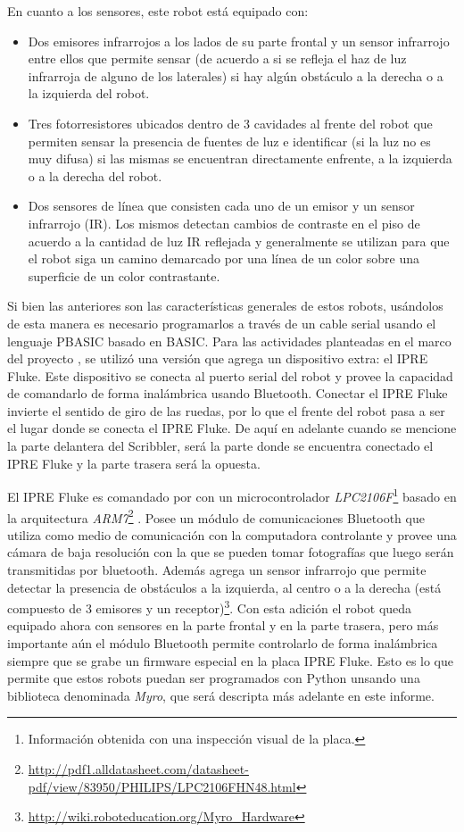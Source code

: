 En cuanto a los sensores, este robot está equipado con:
\begin{itemize}
    \item Dos emisores infrarrojos a los lados de su parte frontal y un
        sensor infrarrojo entre ellos que permite sensar (de acuerdo a si se
        refleja el haz de luz infrarroja de alguno de los laterales) si
        hay algún obstáculo a la derecha o a la izquierda del robot.
    \item Tres fotorresistores ubicados dentro de 3 cavidades al frente del
        robot que permiten sensar la presencia de fuentes de luz e
        identificar (si la luz no es muy difusa) si las mismas se encuentran
        directamente enfrente, a la izquierda o a la derecha del robot.
    \item Dos sensores de línea que consisten cada uno de un emisor
        y un sensor infrarrojo (IR). Los mismos detectan cambios de contraste
        en el piso de acuerdo a la cantidad de luz IR reflejada y generalmente
        se utilizan para que el robot siga un camino demarcado por una línea
        de un color sobre una superficie de un color contrastante.
\end{itemize}

Si bien las anteriores son las características generales de estos robots, usándolos
de esta manera es necesario programarlos a través de un cable serial usando el
lenguaje PBASIC basado en BASIC. Para las actividades planteadas en el marco del
proyecto \proyecto{}, se utilizó  una versión
que agrega un dispositivo extra: el IPRE Fluke. Este dispositivo se conecta al puerto
serial del robot y provee la capacidad de comandarlo de forma inalámbrica
usando Bluetooth.  Conectar el
IPRE Fluke invierte el sentido de giro de las ruedas, por lo que el frente
del robot pasa a ser el lugar donde se conecta el IPRE Fluke. De aquí
en adelante cuando se mencione la parte delantera del Scribbler, será la
parte donde se encuentra conectado el IPRE Fluke y la parte trasera será la
opuesta.

El IPRE Fluke es comandado por con un microcontrolador
\textit{LPC2106F}\footnote{Información obtenida con una inspección visual
de la placa.}
basado en la arquitectura
\textit{ARM7}\footnote{\url{http://pdf1.alldatasheet.com/datasheet-pdf/view/83950/PHILIPS/LPC2106FHN48.html}}
. Posee un módulo de comunicaciones
Bluetooth que utiliza como medio de comunicación con la computadora
controlante y
provee una cámara de baja resolución con la que se pueden tomar fotografías
que luego serán transmitidas por bluetooth. Además agrega
un sensor infrarrojo que permite detectar la presencia de obstáculos
a la izquierda, al centro o a la derecha (está compuesto de 3 emisores
y un
receptor)\footnote{\url{http://wiki.roboteducation.org/Myro_Hardware}}.
Con esta adición el robot queda equipado ahora con sensores
en la parte frontal y en la parte trasera, pero más importante aún
el módulo Bluetooth permite controlarlo de forma inalámbrica siempre
que se grabe un firmware especial en la placa IPRE Fluke. Esto es lo que permite
que estos robots puedan ser programados con Python unsando una biblioteca denominada
\textit{Myro}, que será descripta más adelante en este informe.

